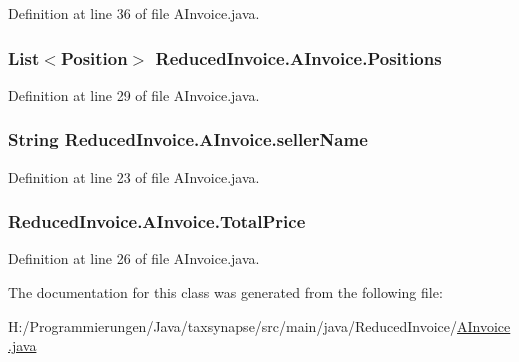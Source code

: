 Definition at line 36 of file A\-Invoice.\-java.

\hypertarget{class_reduced_invoice_1_1_a_invoice_a5b51f1865386bd021580507c7133f69a}{
\subsubsection[{Positions}]{\setlength{\rightskip}{0pt plus 5cm}List$<${\bf Position}$>$ Reduced\-Invoice.\-A\-Invoice.\-Positions\hspace{0.3cm}{\ttfamily [protected]}}}\label{class_reduced_invoice_1_1_a_invoice_a5b51f1865386bd021580507c7133f69a}


Definition at line 29 of file A\-Invoice.\-java.

\hypertarget{class_reduced_invoice_1_1_a_invoice_ae00a97e1c74841fe0b0b43fccd1da24d}{
\subsubsection[{seller\-Name}]{\setlength{\rightskip}{0pt plus 5cm}String Reduced\-Invoice.\-A\-Invoice.\-seller\-Name\hspace{0.3cm}{\ttfamily [protected]}}}\label{class_reduced_invoice_1_1_a_invoice_ae00a97e1c74841fe0b0b43fccd1da24d}


Definition at line 23 of file A\-Invoice.\-java.

\hypertarget{class_reduced_invoice_1_1_a_invoice_a72b831e7ee0b4501fc949f61aecdd498}{
\subsubsection[{Total\-Price}]{ Reduced\-Invoice.\-A\-Invoice.\-Total\-Price\hspace{0.3cm}{\ttfamily [protected]}}}\label{class_reduced_invoice_1_1_a_invoice_a72b831e7ee0b4501fc949f61aecdd498}


Definition at line 26 of file A\-Invoice.\-java.



The documentation for this class was generated from the following file\-:\begin{DoxyCompactItemize}
\item 
H\-:/\-Programmierungen/\-Java/taxsynapse/src/main/java/\-Reduced\-Invoice/\hyperlink{_a_invoice_8java}{A\-Invoice.\-java}\end{DoxyCompactItemize}
